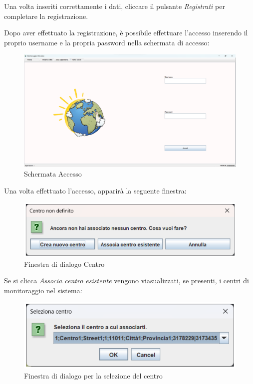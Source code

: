Una volta inseriti correttamente i dati, cliccare il pulsante \emph{Registrati} per completare la registrazione.

Dopo aver effettuato la registrazione, è possibile effettuare l'accesso inserendo il proprio username e la propria password nella schermata di accesso:
\begin{figure}[H]
    \centering
    \includegraphics[width=1\textwidth]{../../img/schermata_login.png}
    \caption{Schermata Accesso}
\end{figure}

Una volta effettuato l'accesso, apparirà la seguente finestra: 
\begin{figure}[H]
    \centering
    \includegraphics[width=1\textwidth]{../../img/finestra_centro.png}
    \caption{Finestra di dialogo Centro}
\end{figure}

Se si clicca \emph{Associa centro esistente} vengono viasualizzati, se presenti, i centri di monitoraggio nel sistema:
\begin{figure}[H]
    \centering
    \includegraphics[width=1\textwidth]{../../img/seleziona_centro.png}
    \caption{Finestra di dialogo per la selezione del centro}
\end{figure}

